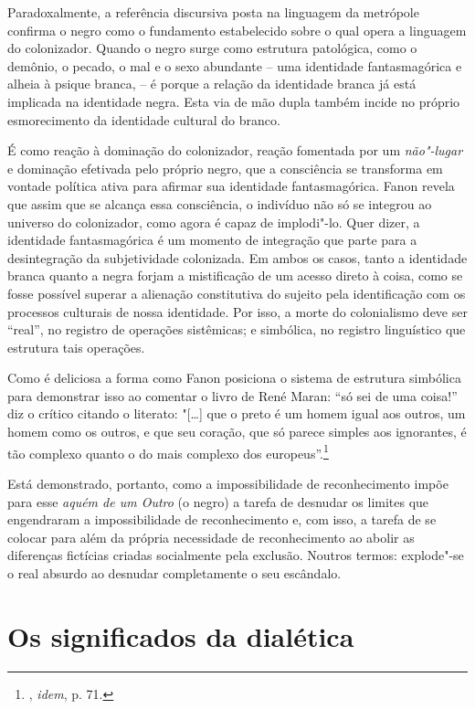 Paradoxalmente, a referência discursiva posta na linguagem da metrópole
confirma o negro como o fundamento estabelecido sobre o qual opera a
linguagem do colonizador. Quando
o negro surge como estrutura patológica, como o demônio, o pecado, o mal
e o sexo abundante -- uma identidade fantasmagórica e alheia à psique
branca, -- é porque a relação da identidade branca já está implicada na
identidade negra. Esta via de mão dupla também incide no próprio
esmorecimento da identidade cultural do branco.

É como reação à dominação do
colonizador, reação fomentada por um \emph{não"-lugar} e dominação
efetivada pelo próprio negro, que a consciência se transforma em vontade
política ativa para afirmar sua identidade fantasmagórica. Fanon revela
que assim que se alcança essa consciência, o indivíduo não só se
integrou ao universo do colonizador, como agora é capaz de implodi"-lo.
Quer dizer, a identidade fantasmagórica é um momento de integração que
parte para a desintegração da subjetividade colonizada. Em ambos os
casos, tanto a identidade branca quanto a negra forjam a mistificação de
um acesso direto à coisa, como se fosse possível superar a alienação
constitutiva do sujeito pela identificação com os processos culturais de
nossa identidade. Por isso, a morte do colonialismo deve ser ``real'', no
registro de operações sistêmicas; e simbólica, no registro linguístico
que estrutura tais operações.

Como é deliciosa a forma como Fanon posiciona o sistema de estrutura
simbólica para demonstrar isso ao comentar o livro de René Maran: ``só
sei de uma coisa!'' diz o crítico citando o literato: "{[}\ldots{}{]} que o
preto é um homem igual aos outros, um homem como os outros, e que seu
coração, que só parece simples aos ignorantes, é tão complexo quanto o
do mais complexo dos europeus''.\footnote{, \emph{idem}, p. 71.}

Está demonstrado, portanto, como a impossibilidade de reconhecimento
impõe para esse \emph{aquém de um Outro} (o negro) a tarefa de desnudar
os limites que engendraram a impossibilidade de reconhecimento e, com
isso, a tarefa de se colocar para além da própria necessidade de
reconhecimento ao abolir as diferenças fictícias criadas socialmente
pela exclusão. Noutros termos: explode"-se o real absurdo ao desnudar
completamente o seu escândalo.

\chapter{Os significados da dialética}

